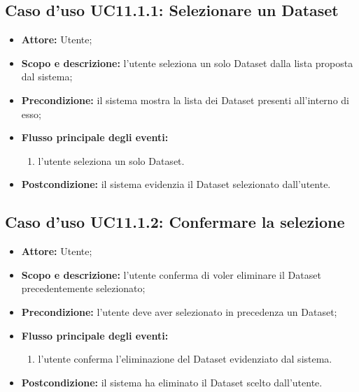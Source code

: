 \subsection{Caso d'uso UC11.1.1: Selezionare un Dataset}
\begin{itemize}
\item \textbf{Attore:} Utente;
\item \textbf{Scopo e descrizione:} l'utente seleziona un solo Dataset\glossario{} dalla lista proposta dal sistema;
\item \textbf{Precondizione:} il sistema mostra la lista dei Dataset\glossario{} presenti all'interno di esso;
\item \textbf{Flusso principale degli eventi:}
\begin{enumerate}
\item l'utente seleziona un solo Dataset\glossario{}.
\end{enumerate}
\item \textbf{Postcondizione:} il sistema evidenzia il Dataset\glossario{} selezionato dall'utente.
\end{itemize}

\subsection{Caso d'uso UC11.1.2: Confermare la selezione}
\begin{itemize}
\item \textbf{Attore:} Utente;
\item \textbf{Scopo e descrizione:} l'utente conferma di voler eliminare il Dataset\glossario{} precedentemente selezionato;
\item \textbf{Precondizione:} l'utente deve aver selezionato in precedenza un Dataset\glossario{};
\item \textbf{Flusso principale degli eventi:}
\begin{enumerate}
\item l'utente conferma l'eliminazione del Dataset\glossario{} evidenziato dal sistema.
\end{enumerate}
\item \textbf{Postcondizione:} il sistema ha eliminato il Dataset\glossario{} scelto dall'utente.
\end{itemize}



